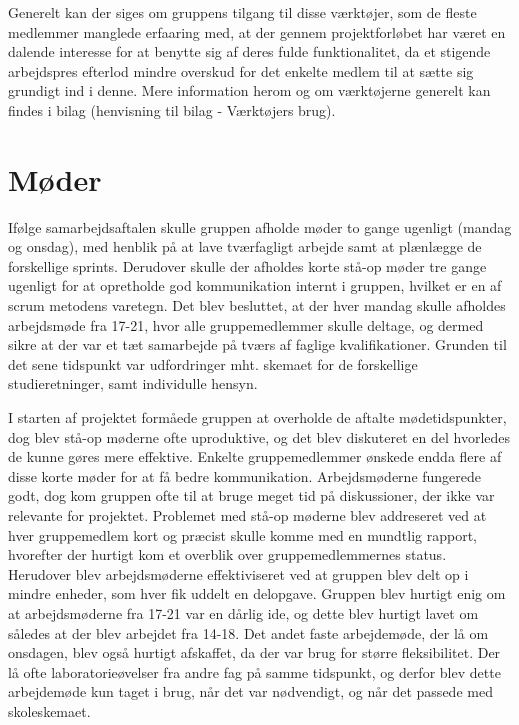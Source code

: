 Generelt kan der siges om gruppens tilgang til disse værktøjer, som de fleste medlemmer manglede erfaaring med, at der gennem projektforløbet har været en dalende interesse for at benytte sig af deres fulde funktionalitet, da et stigende arbejdspres efterlod mindre overskud for det enkelte medlem til at sætte sig grundigt ind i denne. Mere information herom og om værktøjerne generelt kan findes i bilag (henvisning til bilag - Værktøjers brug).

\section{Møder}
Ifølge samarbejdsaftalen skulle gruppen afholde møder to gange ugenligt (mandag og onsdag), med henblik på at lave tværfagligt arbejde samt at plænlægge
de forskellige sprints. Derudover skulle der afholdes korte stå-op møder tre gange ugenligt for at opretholde god kommunikation internt i gruppen,
hvilket er en af scrum metodens varetegn.
Det blev besluttet, at der hver mandag skulle afholdes arbejdsmøde fra 17-21, hvor alle gruppemedlemmer skulle deltage, og dermed sikre at der var
et tæt samarbejde på tværs af faglige kvalifikationer. Grunden til det sene tidspunkt var udfordringer mht. skemaet for de forskellige studieretninger,
samt individulle hensyn. 

I starten af projektet formåede gruppen at overholde de aftalte mødetidspunkter, dog blev stå-op møderne ofte uproduktive, og det blev diskuteret en del 
hvorledes de kunne gøres mere effektive. Enkelte gruppemedlemmer ønskede endda flere af disse korte møder for at få bedre kommunikation. Arbejdsmøderne 
fungerede godt, dog kom gruppen ofte til at bruge meget tid på diskussioner, der ikke var relevante for projektet. Problemet med stå-op møderne 
blev addreseret ved at hver gruppemedlem kort og præcist skulle komme med en mundtlig rapport, hvorefter der hurtigt kom et overblik over gruppemedlemmernes
 status. Herudover blev arbejdsmøderne effektiviseret ved at gruppen blev delt op i mindre enheder, som hver fik uddelt en delopgave. Gruppen blev hurtigt 
 enig om at arbejdsmøderne fra 17-21 var en dårlig ide, og dette blev hurtigt lavet om således at der blev arbejdet fra 14-18. Det andet faste arbejdemøde, 
 der lå om onsdagen, blev også hurtigt afskaffet, da der var brug for større fleksibilitet. Der lå ofte laboratorieøvelser fra andre fag på samme tidspunkt, 
 og derfor blev dette arbejdemøde kun taget i brug, når det var nødvendigt, og når det passede med skoleskemaet.    

